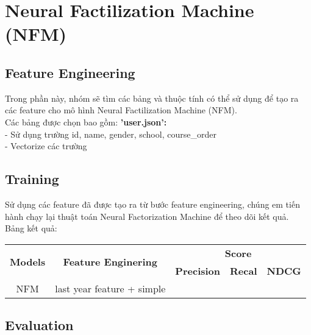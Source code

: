\section{Neural Factilization Machine (NFM)}
\subsection{Feature Engineering}
Trong phần này, nhóm sẽ tìm các bảng và thuộc tính có thể sử dụng để tạo ra các feature cho mô hình Neural Factilization Machine (NFM).\\
Các bảng được chọn bao gồm:
\textbf{'user.json':}\\
- Sử dụng trường id, name, gender, school, course_order\\
- Vectorize các trường\\
\subsection{Training}
Sử dụng các feature đã được tạo ra từ bước feature engineering, chúng em tiến hành chạy lại thuật toán Neural Factorization Machine để theo dõi kết quả.\\
Bảng kết quả:
\begin{table}[]
    \begin{tabular}{ccclllll}
    \hline
    \multirow{2}{*}{\textbf{Models}} &
      \multirow{2}{*}{\textbf{Feature Enginering}} &
      \multicolumn{6}{c}{\textbf{Score}} \\ \cline{3-8} 
     &
       &
      \multicolumn{2}{c}{\textbf{Precision}} &
      \multicolumn{2}{c}{\textbf{Recal}} &
      \multicolumn{2}{c}{\textbf{NDCG}} \\ \hline
    NFM &
      \multicolumn{1}{l}{last year feature + simple} &
      \multicolumn{1}{l}{} &
       &
       &
       &
       &
      
\end{tabular}
\end{table}
\subsection{Evaluation}